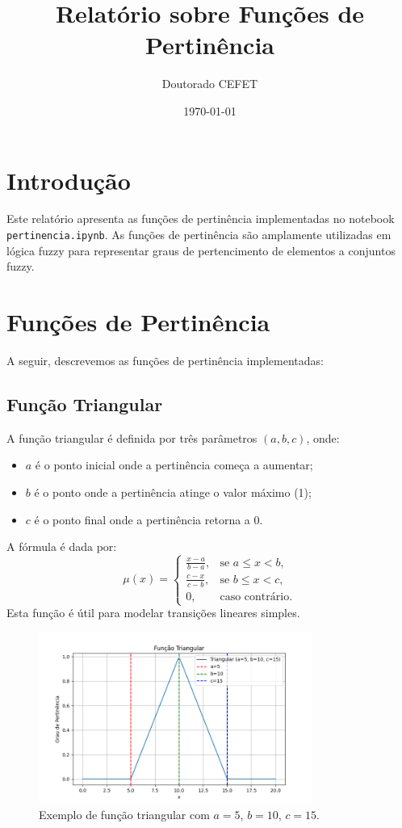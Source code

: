 \documentclass[a4paper,12pt]{article}
\title{Relatório sobre Funções de Pertinência}
\author{Doutorado CEFET}
\date{\today}
\begin{document}
\maketitle

\section{Introdução}
Este relatório apresenta as funções de pertinência implementadas no notebook \texttt{pertinencia.ipynb}. As funções de pertinência são amplamente utilizadas em lógica fuzzy para representar graus de pertencimento de elementos a conjuntos fuzzy.

\section{Funções de Pertinência}
A seguir, descrevemos as funções de pertinência implementadas:

\subsection{Função Triangular}
A função triangular é definida por três parâmetros $(a, b, c)$, onde:
\begin{itemize}
    \item $a$ é o ponto inicial onde a pertinência começa a aumentar;
    \item $b$ é o ponto onde a pertinência atinge o valor máximo (1);
    \item $c$ é o ponto final onde a pertinência retorna a 0.
\end{itemize}
A fórmula é dada por:
\[
\mu(x) =
\begin{cases}
\frac{x - a}{b - a}, & \text{se } a \leq x < b, \\
\frac{c - x}{c - b}, & \text{se } b \leq x < c, \\
0, & \text{caso contrário.}
\end{cases}
\]
Esta função é útil para modelar transições lineares simples.
\begin{figure}[H]
    \centering
    \includegraphics[width=0.8\textwidth]{img/triangular.png}
    \caption{Exemplo de função triangular com $a=5$, $b=10$, $c=15$.}
\end{figure}
\end{document}
